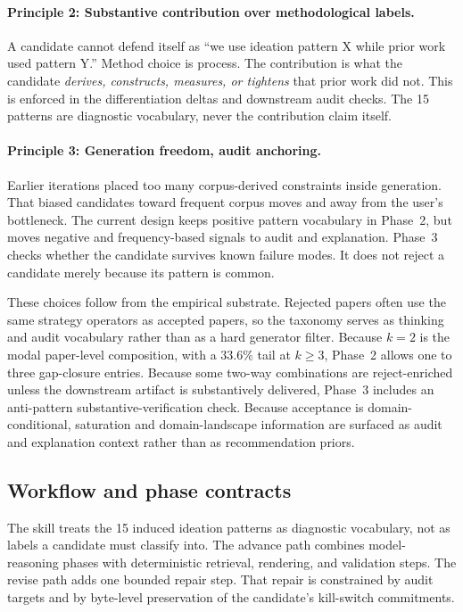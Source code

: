 \documentclass[10pt,a4paper]{article}
\begin{document}
\paragraph{Principle 2: Substantive contribution over methodological labels.} A candidate cannot defend itself as ``we use ideation pattern X while prior work used pattern Y.'' Method choice is process. The contribution is what the candidate \emph{derives, constructs, measures, or tightens} that prior work did not. This is enforced in the differentiation deltas and downstream audit checks. The 15 patterns are diagnostic vocabulary, never the contribution claim itself.

\paragraph{Principle 3: Generation freedom, audit anchoring.} Earlier iterations placed too many corpus-derived constraints inside generation. That biased candidates toward frequent corpus moves and away from the user's bottleneck. The current design keeps positive pattern vocabulary in Phase~2, but moves negative and frequency-based signals to audit and explanation. Phase~3 checks whether the candidate survives known failure modes. It does not reject a candidate merely because its pattern is common.

These choices follow from the empirical substrate. Rejected papers often use the same strategy operators as accepted papers, so the taxonomy serves as thinking and audit vocabulary rather than as a hard generator filter. Because $k=2$ is the modal paper-level composition, with a $33.6\%$ tail at $k \geq 3$, Phase~2 allows one to three gap-closure entries. Because some two-way combinations are reject-enriched unless the downstream artifact is substantively delivered, Phase~3 includes an anti-pattern substantive-verification check. Because acceptance is domain-conditional, saturation and domain-landscape information are surfaced as audit and explanation context rather than as recommendation priors.

\subsection{Workflow and phase contracts}
\label{subsec:skill-workflow}

The skill treats the 15 induced ideation patterns as diagnostic vocabulary, not as labels a candidate must classify into. The advance path combines model-reasoning phases with deterministic retrieval, rendering, and validation steps. The revise path adds one bounded repair step. That repair is constrained by audit targets and by byte-level preservation of the candidate's kill-switch commitments.
\end{document}
